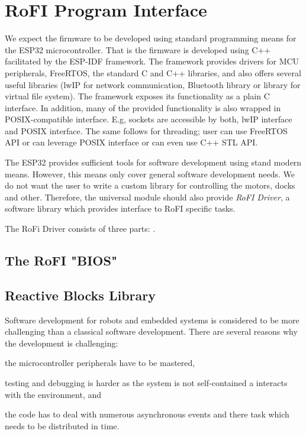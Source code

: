 \section{RoFI Program Interface}

We expect the firmware to be developed using standard programming means for the
ESP32 microcontroller. That is the firmware is developed using C++ facilitated
by the ESP-IDF \cite{noauthor_esp-idf_nodate} framework. The framework provides
drivers for MCU peripherals, FreeRTOS, the standard C and C++ libraries, and
also offers several useful libraries (lwIP for network communication, Bluetooth
library or library for virtual file system). The framework exposes its
functionality as a plain C interface. In addition, many of the provided
functionality is also wrapped in POSIX-compatible interface. E.g, sockets are
accessible by both, lwIP interface and POSIX interface. The same follows for
threading; user can use FreeRTOS API or can leverage POSIX interface or can even
use C++ STL API.

The ESP32 provides sufficient tools for software development using stand modern
means. However, this means only cover general software development needs. We do
not want the user to write a custom library for controlling the motors, docks
and other. Therefore, the universal module should also provide \emph{RoFI
Driver}, a software library which provides interface to RoFI specific tasks.

The RoFi Driver consists of three parts: .

\subsection{The RoFI "BIOS"}

\subsection{Reactive Blocks Library}

Software development for robots and embedded systems is considered to be more
challenging than a classical software development. There are several reasons
why the development is challenging:
\begin{enumerate*}
    \item the microcontroller peripherals have to be mastered,
    \item testing and debugging is harder as the system is not self-contained a
    interacts with the environment, and
    \item the code has to deal with numerous asynchronous events and there task
    which needs to be distributed in time.
\end{enumerate*}

